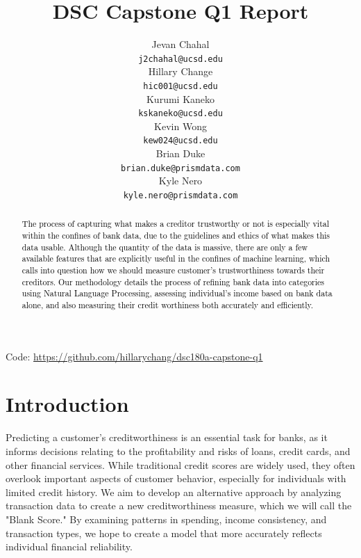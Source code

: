 \documentclass[12pt,letterpaper]{article}
\title{DSC Capstone Q1 Report}
\author{Jevan Chahal\\
  {\tt j2chahal@ucsd.edu} \\\And
  Hillary Change \\
  {\tt hic001@ucsd.edu} \\\And
  Kurumi Kaneko \\
  {\tt kskaneko@ucsd.edu} \\\And
  Kevin Wong \\
  {\tt kew024@ucsd.edu} \\\And
  Brian Duke \\
  {\tt brian.duke@prismdata.com} \\\And
  Kyle Nero \\
  {\tt kyle.nero@prismdata.com} \\}
\begin{document}
\maketitle


\begin{abstract}
    \textcolor{Black}{
    The process of capturing what makes a creditor trustworthy or not is especially vital within the confines of bank data, due to the guidelines and ethics of what makes this data usable. Although the quantity of the data is massive, there are only a few available features that are explicitly useful in the confines of machine learning, which calls into question how we should measure customer's trustworthiness towards their creditors. Our methodology details the process of refining bank data into categories using Natural Language Processing, assessing individual's income based on bank data alone, and also measuring their credit worthiness both accurately and efficiently. 
    }
\end{abstract}

\begin{center}
Code: \url{https://github.com/hillarychang/dsc180a-capstone-q1}
\end{center}

\maketoc
\clearpage


\section{Introduction}
Predicting a customer’s creditworthiness is an essential task for banks, as it informs decisions relating to the profitability and risks of loans, credit cards, and other financial services. While traditional credit scores are widely used, they often overlook important aspects of customer behavior, especially for individuals with limited credit history. We aim to develop an alternative approach by analyzing transaction data to create a new creditworthiness measure, which we will call the "Blank Score." By examining patterns in spending, income consistency, and transaction types, we hope to create a model that more accurately reflects individual financial reliability.
\end{document}
